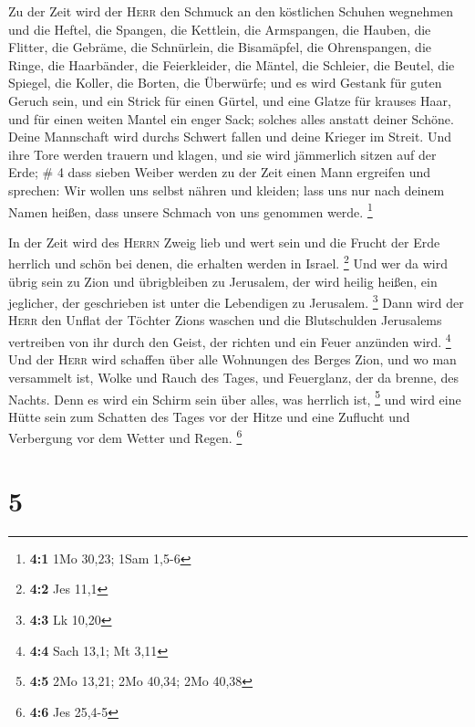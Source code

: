  Zu der Zeit wird der \textsc{Herr} den Schmuck an den
köstlichen Schuhen wegnehmen und die Heftel, die Spangen,
 die Kettlein, die Armspangen, die Hauben,
 die Flitter, die Gebräme, die Schnürlein, die
Bisamäpfel, die Ohrenspangen,  die Ringe, die Haarbänder,
 die Feierkleider, die Mäntel, die Schleier, die Beutel,
 die Spiegel, die Koller, die Borten, die Überwürfe;
 und es wird Gestank für guten Geruch sein, und ein
Strick für einen Gürtel, und eine Glatze für krauses Haar, und für einen
weiten Mantel ein enger Sack; solches alles anstatt deiner Schöne.
 Deine Mannschaft wird durchs Schwert fallen und deine
Krieger im Streit.  Und ihre Tore werden trauern und
klagen, und sie wird jämmerlich sitzen auf der Erde; \# 4 
dass sieben Weiber werden zu der Zeit einen Mann ergreifen und sprechen:
Wir wollen uns selbst nähren und kleiden; lass uns nur nach deinem Namen
heißen, dass unsere Schmach von uns genommen werde. \footnote{\textbf{4:1}
  1Mo 30,23; 1Sam 1,5-6}

 In der Zeit wird des \textsc{Herrn} Zweig lieb und wert
sein und die Frucht der Erde herrlich und schön bei denen, die erhalten
werden in Israel. \footnote{\textbf{4:2} Jes 11,1}  Und
wer da wird übrig sein zu Zion und übrigbleiben zu Jerusalem, der wird
heilig heißen, ein jeglicher, der geschrieben ist unter die Lebendigen
zu Jerusalem. \footnote{\textbf{4:3} Lk 10,20}  Dann wird
der \textsc{Herr} den Unflat der Töchter Zions waschen und die
Blutschulden Jerusalems vertreiben von ihr durch den Geist, der richten
und ein Feuer anzünden wird. \footnote{\textbf{4:4} Sach 13,1; Mt 3,11}
 Und der \textsc{Herr} wird schaffen über alle Wohnungen
des Berges Zion, und wo man versammelt ist, Wolke und Rauch des Tages,
und Feuerglanz, der da brenne, des Nachts. Denn es wird ein Schirm sein
über alles, was herrlich ist, \footnote{\textbf{4:5} 2Mo 13,21; 2Mo
  40,34; 2Mo 40,38}  und wird eine Hütte sein zum Schatten
des Tages vor der Hitze und eine Zuflucht und Verbergung vor dem Wetter
und Regen. \footnote{\textbf{4:6} Jes 25,4-5}

\hypertarget{section-2}{%
\section{5}\label{section-2}}

